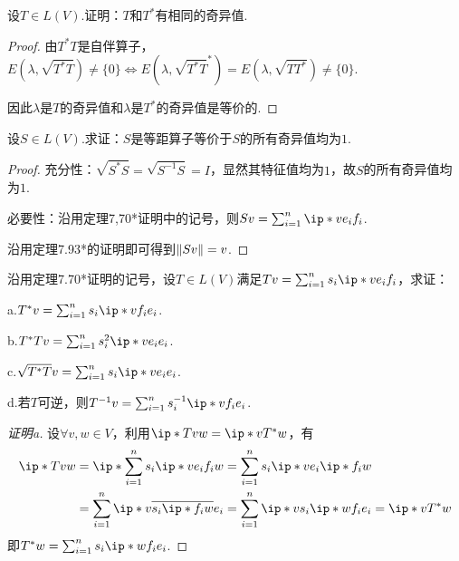 \begin{problem}[11]\label{7.D.11}
    设\(T \in L(V)\).证明：\(T\)和\(T^*\)有相同的奇异值.
\end{problem}

\begin{proof}
    由\(T^*T\)是自伴算子，\(E(\lambda,\sqrt{T^*T}) \ne \{0\} \Leftrightarrow E(\lambda,\sqrt{T^*T}^*)=E(\lambda,\sqrt{TT^*}) \ne \{0\}\).
    
    因此\(\lambda\)是\(T\)的奇异值和\(\lambda\)是\(T^*\)的奇异值是等价的.
\end{proof}

\begin{problem}[15]\label{7.D.15}
    设\(S \in L(V)\).求证：\(S\)是等距算子等价于\(S\)的所有奇异值均为\(1\).
\end{problem}

\begin{proof}
    充分性：\(\sqrt{S^*S}=\sqrt{S^{-1}S}=I\)，显然其特征值均为\(1\)，故\(S\)的所有奇异值均为\(1\).

    必要性：沿用定理7,70*证明中的记号，则\(Sv=\sum_{i=1}^n \ip*{v}{e_i}f_i\).
    
    沿用定理7.93*的证明即可得到\(\norm*{Sv}=v\).
\end{proof}

\newpage

\begin{problem}[17]\label{7.D.17}
    沿用定理7.70*证明的记号，设\(T \in L(V)\)满足\(Tv=\sum_{i=1}^n s_i\ip*{v}{e_i}f_i\)，求证：

    a.\(T^*v=\sum_{i=1}^n s_i\ip*{v}{f_i}e_i\).
    
    b.\(T^*Tv=\sum_{i=1}^n s_i^2 \ip*{v}{e_i}e_i\). 
    
    c.\(\sqrt{T^*T}v=\sum_{i=1}^n s_i\ip*{v}{e_i}e_i\).
    
    d.若\(T\)可逆，则\(T^{-1}v=\sum_{i=1}^n s_i^{-1}\ip*{v}{f_i}e_i\).    
\end{problem}

\begin{proof}[证明a]
    设\(\forall v,w \in V\)，利用\(\ip*{Tv}{w}=\ip*{v}{T^*w}\)，有
    \begin{align*}
        \ip*{Tv}{w}&=\ip*{\sum_{i=1}^n s_i\ip*{v}{e_i}f_i}{w}=\sum_{i=1}^n s_i\ip*{v}{e_i}\ip*{f_i}{w} \\
        &=\sum_{i=1}^n \ip*{v}{\ol{s_i\ip*{f_i}{w}}e_i}=\sum_{i=1}^n \ip*{v}{s_i\ip*{w}{f_i}e_i}=\ip*{v}{T^*w}
    \end{align*}
    即\(T^*w=\sum_{i=1}^n s_i\ip*{w}{f_i}e_i\).
\end{proof}

